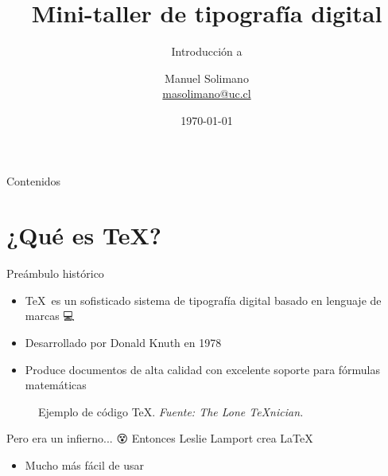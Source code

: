 \documentclass[xetex]{beamer}
\title{Mini-taller de tipografía digital}
\subtitle{Introducción a \LaTeXe}
\author{Manuel Solimano\inst{1} \\ \url{masolimano@uc.cl}}
\institute
{
  \inst{1}%
  Facultad de Física\\
  Pontificia Universidad Católica de Chile
}
\date{\today}
\begin{document}
\begin{frame}
  \titlepage
\end{frame}

\begin{frame}{Contenidos}
  \tableofcontents
\end{frame}

\section{¿Qué es \TeX?}
\begin{frame}{Preámbulo histórico}
\begin{itemize}
    \item \TeX~es un sofisticado sistema de tipografía digital basado en lenguaje de marcas 💻
    \item Desarrollado por Donald Knuth en 1978 👴
    \item Produce documentos de alta calidad con excelente soporte para fórmulas matemáticas 📝
\end{itemize}
\end{frame}

\begin{frame}
  \begin{figure}
    \centering
    \lstset{language=TeX,frame=single}
   \scriptsize
    
 \caption{Ejemplo de código \TeX.  \emph{Fuente: The Lone \TeX{}nician.}}
    \label{fig:texcode}
  \end{figure}
\end{frame}

\begin{frame}{Pero era un infierno... 😵}
    Entonces Leslie Lamport crea \LaTeX
    \begin{itemize}
        \item Mucho más fácil de usar
    \end{itemize}
\end{frame}
\end{document}
